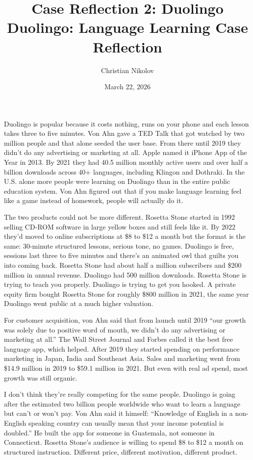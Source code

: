 \documentclass[12pt]{article}
\title{\textbf{Case Reflection 2: Duolingo}\\[0.3em]
\large Duolingo: Language Learning Case Reflection}
\author{Christian Nikolov}
\date{March 22, 2026}
\begin{document}
\maketitle
\thispagestyle{empty}

Duolingo is popular because it costs nothing, runs on your phone and each lesson takes three to five minutes. Von Ahn gave a TED Talk that got watched by two million people and that alone seeded the user base. From there until 2019 they didn't do any advertising or marketing at all. Apple named it iPhone App of the Year in 2013. By 2021 they had 40.5 million monthly active users and over half a billion downloads across 40+ languages, including Klingon and Dothraki. In the U.S. alone more people were learning on Duolingo than in the entire public education system. Von Ahn figured out that if you make language learning feel like a game instead of homework, people will actually do it.

The two products could not be more different. Rosetta Stone started in 1992 selling CD-ROM software in large yellow boxes and still feels like it. By 2022 they'd moved to online subscriptions at \$8 to \$12 a month but the format is the same: 30-minute structured lessons, serious tone, no games. Duolingo is free, sessions last three to five minutes and there's an animated owl that guilts you into coming back. Rosetta Stone had about half a million subscribers and \$200 million in annual revenue. Duolingo had 500 million downloads. Rosetta Stone is trying to teach you properly. Duolingo is trying to get you hooked. A private equity firm bought Rosetta Stone for roughly \$800 million in 2021, the same year Duolingo went public at a much higher valuation.

For customer acquisition, von Ahn said that from launch until 2019 ``our growth was solely due to positive word of mouth, we didn't do any advertising or marketing at all.'' The Wall Street Journal and Forbes called it the best free language app, which helped. After 2019 they started spending on performance marketing in Japan, India and Southeast Asia. Sales and marketing went from \$14.9 million in 2019 to \$59.1 million in 2021. But even with real ad spend, most growth was still organic.

I don't think they're really competing for the same people. Duolingo is going after the estimated two billion people worldwide who want to learn a language but can't or won't pay. Von Ahn said it himself: ``Knowledge of English in a non-English speaking country can usually mean that your income potential is doubled.'' He built the app for someone in Guatemala, not someone in Connecticut. Rosetta Stone's audience is willing to spend \$8 to \$12 a month on structured instruction. Different price, different motivation, different product.
\end{document}
